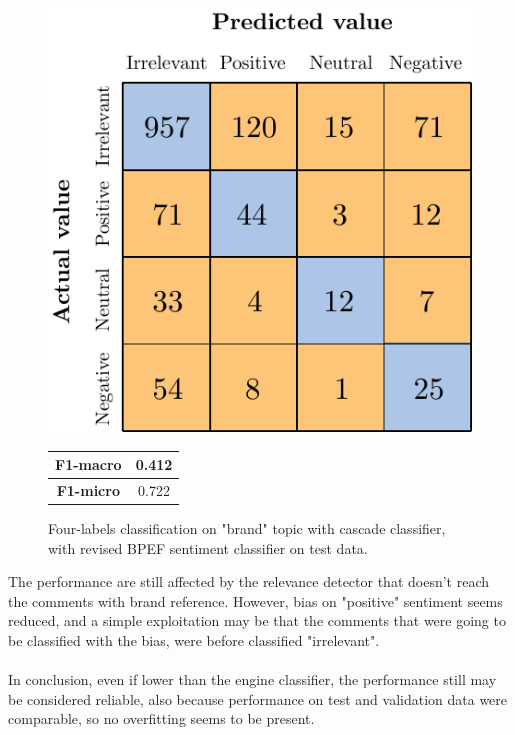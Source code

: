 \begin{figure}[H]
	\begin{minipage}[b]{0.6\linewidth}
		\centering
		\includegraphics[scale=1]{figures/conf_matrices/ita_brand/ita_cascade_brand_bpef_tst.pdf}
	\end{minipage}
	\begin{minipage}[b]{0.3\linewidth}
		\begin{tabular}[b]{ | c | c | } 
			\hline
			\textbf{F1-macro} & 0.412 \\
			\hline
			\textbf{F1-micro} & 0.722 \\ 
			\hline
		\end{tabular}
	\end{minipage}
	\caption{Four-labels classification on "brand" topic with cascade classifier, with revised BPEF sentiment classifier on test data.}
	\label{fig:ita_cascade_brand_bpef_tst}
\end{figure}



The performance are still affected by the relevance detector that doesn't reach the comments with brand reference. However, bias on "positive" sentiment seems reduced, and a simple exploitation may be that the comments that were going to be classified with the bias, were before classified "irrelevant".\\\\
In conclusion, even if lower than the engine classifier, the performance still may be considered reliable, also because performance on test and validation data were comparable, so no overfitting seems to be present.



